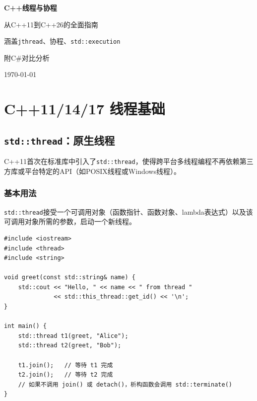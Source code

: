 \documentclass[12pt,a4paper,fontset=fandol]{ctexbook}
\newcommand{\cpp}[1]{C++#1}
\newcommand{\csharp}{C\#}
\begin{document}
\begin{titlepage}
\centering
\vspace*{4cm}
{\Huge\bfseries\color{blue!60!black} \cpp{}线程与协程\par}
\vspace{1cm}
{\LARGE\color{blue!40!black} 从\cpp{}11到\cpp{}26的全面指南\par}
\vspace{2cm}
{\Large\color{gray} 涵盖\texttt{jthread}、协程、\texttt{std::execution}\par}
\vspace{0.5cm}
{\Large\color{gray} 附\csharp{}对比分析\par}
\vfill
{\large\color{linenumgray} \today\par}
\end{titlepage}

\frontmatter
\tableofcontents

\mainmatter

\part{\cpp{}11/14/17 线程基础}

\chapter{\texttt{std::thread}：原生线程}

\cpp{}11首次在标准库中引入了\texttt{std::thread}，使得跨平台多线程编程不再依赖第三方库或平台特定的API（如POSIX线程或Windows线程）。

\section{基本用法}

\texttt{std::thread}接受一个可调用对象（函数指针、函数对象、lambda表达式）以及该可调用对象所需的参数，启动一个新线程。

\begin{lstlisting}
#include <iostream>
#include <thread>
#include <string>

void greet(const std::string& name) {
    std::cout << "Hello, " << name << " from thread "
              << std::this_thread::get_id() << '\n';
}

int main() {
    std::thread t1(greet, "Alice");
    std::thread t2(greet, "Bob");

    t1.join();   // 等待 t1 完成
    t2.join();   // 等待 t2 完成
    // 如果不调用 join() 或 detach()，析构函数会调用 std::terminate()
}
\end{lstlisting}
\end{document}
